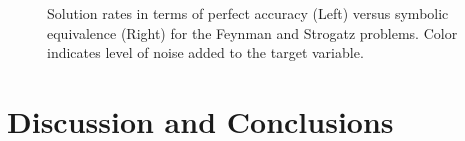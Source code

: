 \begin{figure}
\begin{minipage}{0.49\textwidth}
    \end{minipage}
    \caption{
        Solution rates in terms of perfect accuracy (Left) versus symbolic equivalence (Right) for the Feynman and Strogatz problems. 
        Color indicates level of noise added to the target variable. 
    }
    \label{fig:symbolic_solns}
\end{figure}


\section{Discussion and Conclusions}


